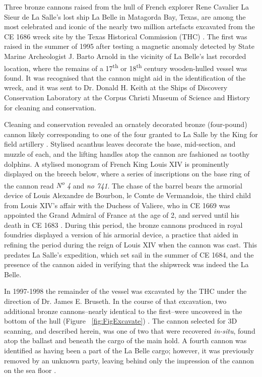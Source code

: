 \documentclass[review]{elsarticle}
\begin{document}
Three bronze cannons raised from the hull of French explorer Rene Cavalier La Sieur de La Salle's lost ship La Belle in Matagorda Bay, Texas, are among the most celebrated and iconic of the nearly two million artefacts excavated from the CE 1686 wreck site by the Texas Historical Commission (THC) \citep{RN5767}. The first was raised in the summer of 1995 after testing a magnetic anomaly detected by State Marine Archeologist J. Barto Arnold in the vicinity of La Belle's last recorded location, where the remains of a 17\textsuperscript{th} or 18\textsuperscript{th} century wooden-hulled vessel \citep{RN5766,RN5765} was found. It was recognised that the cannon might aid in the identification of the wreck, and it was sent to Dr. Donald H. Keith at the Ships of Discovery Conservation Laboratory at the Corpus Christi Museum of Science and History for cleaning and conservation.

Cleaning and conservation revealed an ornately decorated bronze (four-pound) cannon likely corresponding to one of the four granted to La Salle by the King for field artillery \citep{RN5763,RN5764}. Stylised acanthus leaves decorate the base, mid-section, and muzzle of each, and the lifting handles atop the cannon are fashioned as toothy dolphins. A stylised monogram of French King Louis XIV is prominently displayed on the breech below, where a series of inscriptions on the base ring of the cannon read \textit{N\textsuperscript{o} 4} and \textit{no  741}. The chase of the barrel bears the armorial device of Louis Alexandre de Bourbon, le Comte de Vermandois, the third child from Louis XIV's affair with the Duchess of Valiere, who in CE 1669 was appointed the Grand Admiral of France at the age of 2, and served until his death in CE 1683 \citep[354]{RN5763}. During this period, the bronze cannons produced in royal foundries displayed a version of his armorial device, a practice that aided in refining the period during the reign of Louis XIV when the cannon was cast. This predates La Salle's expedition, which set sail in the summer of CE 1684, and the presence of the cannon aided in verifying that the shipwreck was indeed the La Belle.

In 1997-1998 the remainder of the vessel was excavated by the THC under the direction of Dr. James E. Bruseth. In the course of that excavation, two additional bronze cannons--nearly identical to the first--were uncovered in the bottom of the hull (Figure ~\ref{fig:FigExcavate}) \citep{RN5763,RN5762,RN5761}. The cannon selected for 3D scanning, and described herein, was one of two that were recovered \textit{in-situ}, found atop the ballast and beneath the cargo of the main hold. A fourth cannon was identified as having been a part of the La Belle cargo; however, it was previously removed by an unknown party, leaving behind only the impression of the cannon on the sea floor \citep{RN5763}.
\end{document}
